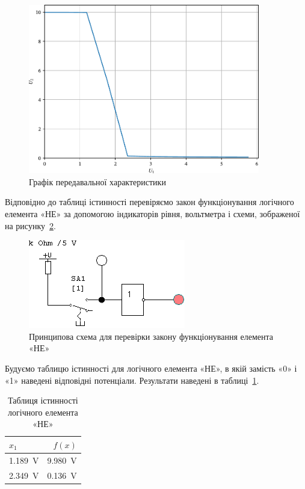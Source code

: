 \documentclass[a4paper,oneside,DIV=10,12pt]{scrartcl}
\begin{document}
			\begin{figure}[!htbp]
			\centering
				\includegraphics[width=0.9\textwidth]{plots/03-pdf/01-01-not-transfer-params-edited.pdf}
			\caption{Графік передавальної характеристики}
			\label{fig:NOT-transfer-params-plot}
			\end{figure}
			
			Відповідно до таблиці істинності перевіряємо закон функціонування логічного елемента «НЕ» за допомогою індикаторів рівня, вольтметра і схеми, зображеної  на рисунку~\ref{fig:NOT-functioning-law-schematic}.
			
			\begin{figure}[!htbp]
			\centering
				\includegraphics[]{schematics/01-03-not.png}
			\caption{Принципова схема для перевірки закону функціонування елемента «НЕ»}
			\label{fig:NOT-functioning-law-schematic}
			\end{figure}
			
			Будуємо таблицю істинності для логічного елемента «НЕ», в якій замість «0» і «1» наведені відповідні потенціали. Результати наведені в таблиці~\ref{tab:not-truth-table}.
			
			\begin{table}[!htbp]
			\centering
				\begin{tabular}{lr}
					\toprule
						$x_1$ & $f(x)$\\
					\midrule
						\SI{1,189}{\volt} & \SI{9,980}{\volt}\\
						\SI{2,349}{\volt} & \SI{0,136}{\volt}\\
					\bottomrule
				\end{tabular}
			\caption{Таблиця істинності логічного елемента «НЕ»}
			\label{tab:not-truth-table}
			\end{table}
			
\end{document}
